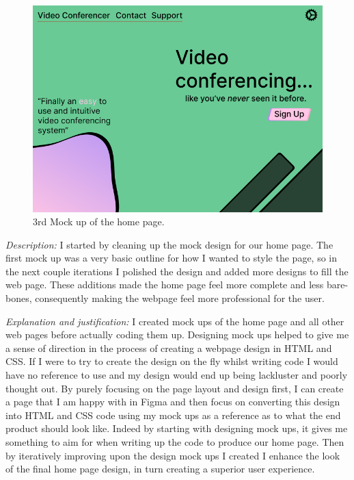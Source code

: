 \begin{figure}[H]
\centering

\includegraphics[scale=0.2]{Images/HomeUI_3.png}

\caption{3rd Mock up of the home page.}
\label{fig:ui3}
\end{figure}

\textit{Description:}
I started by cleaning up the mock design for our home page.
The first mock up was a very basic outline for how I wanted to
style the page, so in the next couple iterations I polished
the design and added more designs to fill the web page. These
additions made the home page feel more complete and less
bare-bones, consequently making the webpage feel more
professional for the user. \\ \vspace{0.2cm}

\textit{Explanation and justification:}
I created mock ups of the home page and all other web pages
before actually coding them up. Designing mock ups helped
to give me a sense of direction in the process of creating a
webpage design in HTML and CSS. If I were to try to create
the design on the fly whilst writing code I would have no
reference to use and my design would end up being lackluster
and poorly thought out. By purely focusing on the page layout
and design first, I can create a page that I am happy with in
Figma and then focus on converting this design into HTML and
CSS code using my mock ups as a reference as to what the end
product should look like. Indeed by starting with designing
mock ups, it gives me something to aim for when writing up
the code to produce our home page. Then by iteratively
improving upon the design mock ups I created I enhance
the look of the final home page design, in turn creating
a superior user experience.
\\ \vspace{0.2cm}

